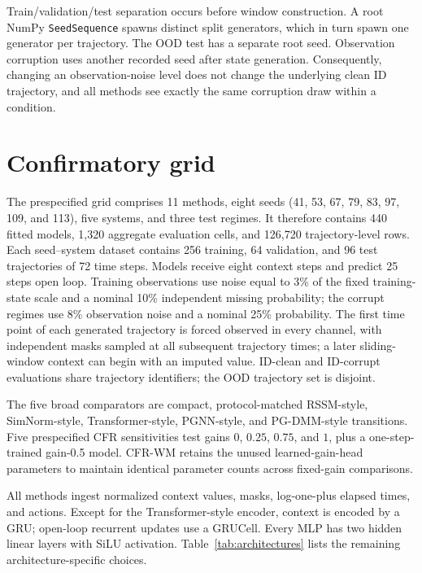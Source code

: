Train/validation/test separation occurs before window construction. A root NumPy \texttt{SeedSequence} spawns distinct split generators, which in turn spawn one generator per trajectory. The OOD test has a separate root seed. Observation corruption uses another recorded seed after state generation. Consequently, changing an observation-noise level does not change the underlying clean ID trajectory, and all methods see exactly the same corruption draw within a condition.

\section{Confirmatory grid}

The prespecified grid comprises 11 methods, eight seeds (41, 53, 67, 79, 83, 97, 109, and 113), five systems, and three test regimes. It therefore contains 440 fitted models, 1,320 aggregate evaluation cells, and 126,720 trajectory-level rows. Each seed--system dataset contains 256 training, 64 validation, and 96 test trajectories of 72 time steps. Models receive eight context steps and predict 25 steps open loop. Training observations use noise equal to 3\% of the fixed training-state scale and a nominal 10\% independent missing probability; the corrupt regimes use 8\% observation noise and a nominal 25\% probability. The first time point of each generated trajectory is forced observed in every channel, with independent masks sampled at all subsequent trajectory times; a later sliding-window context can begin with an imputed value. ID-clean and ID-corrupt evaluations share trajectory identifiers; the OOD trajectory set is disjoint.

The five broad comparators are compact, protocol-matched RSSM-style,
SimNorm-style, Transformer-style, PGNN-style, and PG-DMM-style transitions. Five
prespecified CFR sensitivities test gains $0$, $0.25$, $0.75$, and $1$, plus a
one-step-trained gain-0.5 model. CFR-WM retains the unused learned-gain-head
parameters to maintain identical parameter counts across fixed-gain comparisons.

All methods ingest normalized context values, masks, log-one-plus elapsed times,
and actions. Except for the Transformer-style encoder, context is encoded by a
GRU; open-loop recurrent updates use a GRUCell. Every MLP has two hidden linear
layers with SiLU activation. Table~\ref{tab:architectures} lists the remaining
architecture-specific choices.

